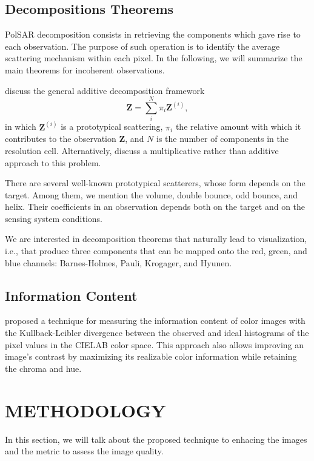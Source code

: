 \documentclass{article}
\begin{document}
\subsection{Decompositions Theorems}

PolSAR decomposition consists in retrieving the components which gave rise to each observation.
The purpose of such operation is to identify the average scattering mechanism within each pixel.
In the following, we will summarize the main theorems for incoherent observations.

\citet{ModelingandInterpretationofScatteringMechanismsinPolarimetricSyntheticApertureRadarAdvancesandPerspectives2014} discuss the general additive decomposition framework
\begin{equation}
\bm Z = \sum_i^N \pi_i \bm Z^{(i)},
\end{equation}
in which $\bm Z^{(i)}$ is a prototypical scattering, 
$\pi_i$ the relative amount with which it contributes to the observation $\bm Z$, and $N$ is the number of components in the resolution cell.
Alternatively, \citet{APolSARScatteringPowerFactorizationFrameworkandNovelRollInvariantParametersBasedUnsupervisedClassificationSchemeUsingaGeodesicDistanceinpress} discuss a multiplicative rather than additive approach to this problem.

There are several well-known prototypical scatterers, whose form depends on the target.
Among them, we mention the volume, double bounce, odd bounce, and helix.
Their coefficients in an observation depends both on the target and on the sensing system conditions.

We are interested in decomposition theorems that naturally lead to visualization, i.e., that produce three components that can be mapped onto the red, green, and blue channels: Barnes-Holmes, Pauli, Krogager, and Hyunen.

\subsection{Information Content}

\citet{AssessingInformationContentinColorImages} proposed a technique for measuring the information content of color images with the Kullback-Leibler divergence between the observed and ideal histograms of the pixel values in the CIELAB color space.
This approach also allows improving an image's contrast by maximizing its realizable color information while retaining the chroma and hue.


\section{METHODOLOGY}
\label{sec:meth}
In this section, we will talk about the proposed technique to enhacing the images and the metric to assess the image quality.
\end{document}
